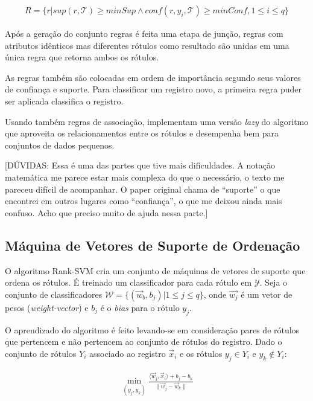 \documentclass[runningheads,a4paper]{llncs}
\begin{document}
\begin{align*}
	R = \{ r | sup(r, \mathcal{T}) \geq minSup \wedge conf(r, y_i, \mathcal{T}) \geq minConf, 1 \leq i \leq q \}
\end{align*}

Após a geração do conjunto regras é feita uma etapa de junção, regras com atributos idênticos mas diferentes rótulos como resultado são unidas em uma única regra que retorna ambos os rótulos.

As regras também são colocadas em ordem de importância segundo seus valores de confiança e suporte. Para classificar um registro novo, a primeira regra puder ser aplicada classifica o registro.

Usando também regras de associação, \cite{Veloso2007-el} implementam uma versão \textit{lazy} do algoritmo que aproveita os relacionamentos entre os rótulos e desempenha bem para conjuntos de dados pequenos.

[DÚVIDAS: Essa é uma das partes que tive mais dificuldades. A notação matemática me parece estar mais complexa do que o necessário, o texto me pareceu difícil de acompanhar. O paper original chama de \enquote{suporte} o que encontrei em outros lugares como \enquote{confiança}, o que me deixou ainda mais confuso. Acho que preciso muito de ajuda nessa parte.]

\subsection{Máquina de Vetores de Suporte de Ordenação}

O algoritmo Rank-SVM \cite{Elisseeff2001-lp} cria um conjunto de máquinas de vetores de suporte que ordena os rótulos. É treinado um classificador para cada rótulo em $\mathcal{Y}$. Seja o conjunto de classificadores $\mathcal{W} = \{ (\vec{w}_b, b_j) | 1 \leq j \leq q \}$, onde $\vec{w_j}$ é um vetor de pesos (\textit{weight-vector}) e $b_j$ é o \textit{bias} para o rótulo $y_j$.

O aprendizado do algoritmo é feito levando-se em consideração pares de rótulos que pertencem e não pertencem ao conjunto de rótulos do registro. Dado o conjunto de rótulos $Y_i$ associado ao registro $\vec{x}_i$ e os rótulos $y_j \in Y_i$ e $y_k \notin Y_i$:

\begin{align} \label{eq:svmdistancia}
	\min_{(y_j, y_k)} \frac{\langle \vec{w}_j, \vec{x}_i \rangle + b_j - b_k}{\lVert \vec{w}_j - \vec{w}_k \rVert}
\end{align}
\end{document}
